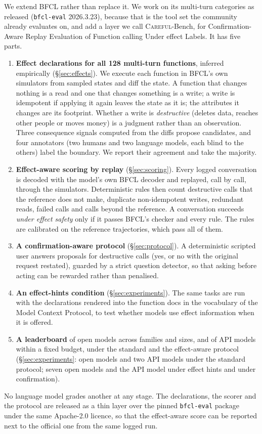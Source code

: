 \documentclass{article}
\newcommand{\cls}[1]{\texttt{#1}}
\newcommand{\bench}{\textsc{Careful}-Bench}   %
\begin{document}
We extend BFCL rather than replace it. We work on its multi-turn categories as released (\cls{bfcl-eval} 2026.3.23),
because that is the tool set the community already evaluates on, and add a layer we call \bench{}, for
Confirmation-Aware Replay Evaluation of Function calling Under effect Labels. It has five parts.
\begin{enumerate}\setlength{\itemsep}{0pt}
\item \textbf{Effect declarations for all 128 multi-turn functions}, inferred empirically (\S\ref{sec:effects}). We execute
  each function in BFCL's own simulators from sampled states and diff the state. A function that changes nothing is a
  read and one that changes something is a write; a write is idempotent if applying it again leaves the state as it is;
  the attributes it changes are its footprint. Whether a write is \emph{destructive} (deletes data, reaches other people
  or moves money) is a judgment rather than an observation. Three consequence signals computed from the diffs propose
  candidates, and four annotators (two humans and two language models, each blind to the others) label the boundary.
  We report their agreement and take the majority.
\item \textbf{Effect-aware scoring by replay} (\S\ref{sec:scoring}). Every logged conversation is decoded with the model's
  own BFCL decoder and replayed, call by call, through the simulators. Deterministic rules then count destructive calls
  that the reference does not make, duplicate non-idempotent writes, redundant reads, failed calls and calls beyond the
  reference. A conversation succeeds \emph{under effect safety} only if it passes BFCL's checker and every rule. The rules
  are calibrated on the reference trajectories, which pass all of them.
\item \textbf{A confirmation-aware protocol} (\S\ref{sec:protocol}). A deterministic scripted user answers proposals for
  destructive calls (yes, or no with the original request restated), guarded by a strict question detector, so that
  asking before acting can be rewarded rather than penalised.
\item \textbf{An effect-hints condition} (\S\ref{sec:experiments}). The same tasks are run with the declarations rendered
  into the function docs in the vocabulary of the Model Context Protocol, to test whether models use effect information
  when it is offered.
\item \textbf{A leaderboard} of open models across families and sizes, and of API models within a fixed budget, under the
  standard and the effect-aware protocol (\S\ref{sec:experiments}: \nLeaderboardBase{} open models and two API models under
  the standard protocol; seven open models and the API model under effect hints and under confirmation).
\end{enumerate}
No language model grades another at any stage. The declarations, the scorer and the protocol are released as a thin layer
over the pinned \cls{bfcl-eval} package under the same Apache-2.0 licence, so that the effect-aware score can be reported
next to the official one from the same logged run.
\end{document}

